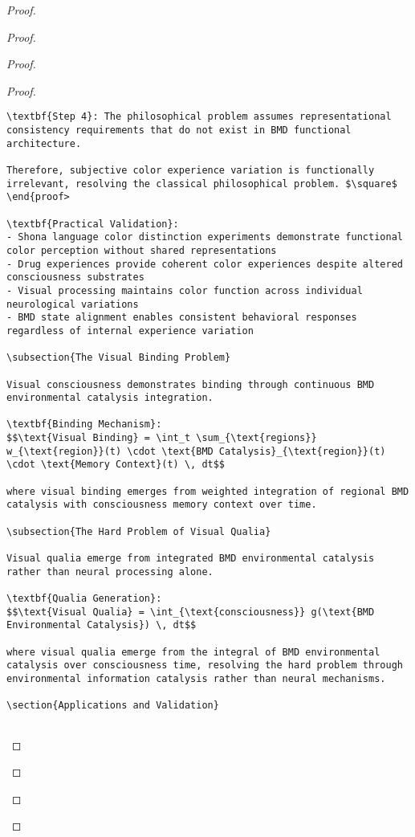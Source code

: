 \documentclass[12pt,a4paper]{article}
\begin{document}
\begin{proof}
{\begin{proof}
\begin{proof}
\begin{proof}
\begin{lstlisting}[style=pythonstyle, caption=Visual Memory BMD Integration]
\textbf{Step 4}: The philosophical problem assumes representational consistency requirements that do not exist in BMD functional architecture.

Therefore, subjective color experience variation is functionally irrelevant, resolving the classical philosophical problem. $\square$
\end{proof>

\textbf{Practical Validation}:
- Shona language color distinction experiments demonstrate functional color perception without shared representations
- Drug experiences provide coherent color experiences despite altered consciousness substrates
- Visual processing maintains color function across individual neurological variations
- BMD state alignment enables consistent behavioral responses regardless of internal experience variation

\subsection{The Visual Binding Problem}

Visual consciousness demonstrates binding through continuous BMD environmental catalysis integration.

\textbf{Binding Mechanism}:
$$\text{Visual Binding} = \int_t \sum_{\text{regions}} w_{\text{region}}(t) \cdot \text{BMD Catalysis}_{\text{region}}(t) \cdot \text{Memory Context}(t) \, dt$$

where visual binding emerges from weighted integration of regional BMD catalysis with consciousness memory context over time.

\subsection{The Hard Problem of Visual Qualia}

Visual qualia emerge from integrated BMD environmental catalysis rather than neural processing alone.

\textbf{Qualia Generation}:
$$\text{Visual Qualia} = \int_{\text{consciousness}} g(\text{BMD Environmental Catalysis}) \, dt$$

where visual qualia emerge from the integral of BMD environmental catalysis over consciousness time, resolving the hard problem through environmental information catalysis rather than neural mechanisms.

\section{Applications and Validation}


\end{lstlisting}
\end{proof}
\end{proof}
\end{proof}}
\end{proof}
\end{document}
